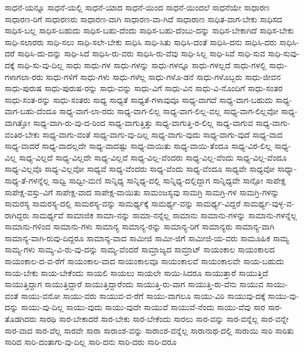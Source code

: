 {ಸಾಧನೆ-ಯನ್ನೂ
ಸಾಧನೆ-ಯಲ್ಲಿ
ಸಾಧನೆ-ಯಾದ
ಸಾಧನೆ-ಯಿಂದ
ಸಾಧನೆ-ಯಿಂದಲೆ
ಸಾಧನೆಯೇ
ಸಾಧಾರಣ
ಸಾಧಾರಣ-ರಿಗೆ
ಸಾಧಾರಣರು
ಸಾಧಾರಣ-ವಾಗಿ
ಸಾಧಾರಣ-ವಾ-ಗಿದೆ
ಸಾಧಾರಾಣ
ಸಾಧಿತ-ವಾಗ-ಬೇಕು
ಸಾಧಿಸದ
ಸಾಧಿಸ-ಬಲ್ಲ
ಸಾಧಿಸ-ಬಹುದು
ಸಾಧಿಸ-ಬಹು-ದೆಂದು
ಸಾಧಿಸ-ಬಹು-ದೆಂಬು-ದನ್ನು
ಸಾಧಿಸ-ಬೇಕಾಗಿದೆ
ಸಾಧಿಸ-ಬೇಕು
ಸಾಧಿ-ಸಲಾರರು
ಸಾಧಿ-ಸಲು
ಸಾಧಿ-ಸಲೇ-ಬೇಕು
ಸಾಧಿಸಿ
ಸಾಧಿ-ಸಿತು
ಸಾಧಿಸಿ-ದಂತೆ
ಸಾಧಿಸಿ-ದನು
ಸಾಧಿಸಿ-ದರು
ಸಾಧಿಸಿ-ದರೆ
ಸಾಧಿಸಿ-ದು-ದನ್ನು
ಸಾಧಿ-ಸಿದೆ
ಸಾಧಿಸಿ-ರು-ವರು
ಸಾಧಿಸಿ-ರು-ವೆವು
ಸಾಧಿ-ಸಿಲ್ಲ
ಸಾಧಿ-ಸಿವೆ
ಸಾಧಿ-ಸುವ
ಸಾಧಿ-ಸುವು-ದಕ್ಕೆ
ಸಾಧಿ-ಸು-ವು-ದಿಲ್ಲ
ಸಾಧು
ಸಾಧು-ಗಳ
ಸಾಧು-ಗಳನ್ನು
ಸಾಧು-ಗಳನ್ನೂ
ಸಾಧು-ಗಳಲ್ಲದೆ
ಸಾಧು-ಗಳಲ್ಲಿ
ಸಾಧು-ಗಳಾಗಲಾ-ರರು
ಸಾಧು-ಗಳಿಗೆ
ಸಾಧು-ಗಳು
ಸಾಧು-ಗಳೆಲ್ಲ
ಸಾಧು-ಗಳೊ-ಡನೆ
ಸಾಧು-ಗಳೊಬ್ಬರು
ಸಾಧು-ಜೀವನ
ಸಾಧು-ಪುರುಷ
ಸಾಧು-ಪುರುಷ-ರನ್ನು
ಸಾಧು-ವನ್ನು
ಸಾಧು-ವಿಗೆ
ಸಾಧು-ವಿನ
ಸಾಧು-ವಿ-ನೊಂದಿಗೆ
ಸಾಧು-ಸಂತರ
ಸಾಧು-ಸಂತ-ರನ್ನು
ಸಾಧು-ಸಂತರು
ಸಾಧ್ಯ
ಸಾಧ್ಯತೆ
ಸಾಧ್ಯತೆ-ಗಳಾವುವೂ
ಸಾಧ್ಯ-ವಾಗದೆ
ಸಾಧ್ಯ-ವಾಗ-ಬಹುದು
ಸಾಧ್ಯ-ವಾಗ-ಬಹು-ದೆಂದೂ
ಸಾಧ್ಯ-ವಾಗ-ಲಾ-ರದು
ಸಾಧ್ಯ-ವಾಗ-ಲಿಲ್ಲ
ಸಾಧ್ಯ-ವಾಗ-ಲಿಲ್ಲ-ವಲ್ಲ
ಸಾಧ್ಯ-ವಾಗ-ಲಿಲ್ಲವೋ
ಸಾಧ್ಯ-ವಾಗಿತ್ತೋ
ಸಾಧ್ಯ-ವಾಗಿ-ರು-ವು-ದ-ರಿಂದ
ಸಾಧ್ಯ-ವಾಗುತ್ತಿತ್ತು
ಸಾಧ್ಯ-ವಾಗುತ್ತಿ-ರ-ಲಿಲ್ಲ
ಸಾಧ್ಯ-ವಾಗುವ
ಸಾಧ್ಯ-ವಾಗು-ವಂತಿರ-ಬೇಕು
ಸಾಧ್ಯ-ವಾಗು-ವಂತೆ
ಸಾಧ್ಯ-ವಾಗು-ವು-ದಿಲ್ಲ
ಸಾಧ್ಯ-ವಾಗು-ವುದು
ಸಾಧ್ಯ-ವಾಗು-ವುದೆ
ಸಾಧ್ಯ-ವಾದ
ಸಾಧ್ಯ-ವಾದರೆ
ಸಾಧ್ಯ-ವಾದಲ್ಲದೇ
ಸಾಧ್ಯ-ವಾದಷ್ಟು
ಸಾಧ್ಯ-ವಾಯಿತು
ಸಾಧ್ಯ-ವಾಯಿ-ತೆಂದೂ
ಸಾಧ್ಯ-ವಿರ-ಲಿಲ್ಲ
ಸಾಧ್ಯ-ವಿಲ್ಲ
ಸಾಧ್ಯ-ವಿಲ್ಲದೆ
ಸಾಧ್ಯ-ವಿಲ್ಲದೇ
ಸಾಧ್ಯ-ವಿಲ್ಲವೆ
ಸಾಧ್ಯ-ವಿಲ್ಲ-ವೆಂದರು
ಸಾಧ್ಯ-ವಿಲ್ಲ-ವೆಂದು
ಸಾಧ್ಯ-ವಿಲ್ಲ-ವೆಂದೂ
ಸಾಧ್ಯ-ವಿಲ್ಲವೊ
ಸಾಧ್ಯ-ವಿಲ್ಲವೋ
ಸಾಧ್ಯವೆ
ಸಾಧ್ಯ-ವೆಂದರು
ಸಾಧ್ಯ-ವೆಂದು
ಸಾಧ್ಯ-ವೆಂದೂ
ಸಾಧ್ಯವೇ
ಸಾಧ್ಯವೋ
ಸಾಧ್ಯಾ-ಸಾಧ್ಯ-ತೆ-ಗಳನ್ನೆಲ್ಲ
ಸಾಧ್ವಿ
ಸಾಧ್ವೀ-ಮಣಿ
ಸಾನ್ನಿಧ್ಯ
ಸಾನ್ನಿಧ್ಯ-ದಲ್ಲಿ
ಸಾನ್ನಿಧ್ಯ-ದಲ್ಲಿದ್ದಾಗ
ಸಾನ್ನಿಧ್ಯವೇ
ಸಾನ್ಪೋ
ಸಾಪೇಕ್ಷ
ಸಾಪೇಕ್ಷ-ವಸ್ತು-ವಿಗೆ
ಸಾಪೇಕ್ಷ-ವಾದ
ಸಾಪೇಕ್ಷ-ವಾಯಿತು
ಸಾಮಂಜಸ್ಯವು
ಸಾಮಗ್ರಿ
ಸಾಮಗ್ರಿ-ಗಳ
ಸಾಮಗ್ರಿ-ಗಳನ್ನು
ಸಾಮರಸ್ಯ
ಸಾಮರಸ್ಯ-ದಲ್ಲಿ
ಸಾಮರಸ್ಯ-ವನ್ನು
ಸಾಮರ್ಥ್ಯಕ್ಕೆ
ಸಾಮರ್ಥ್ಯ-ವನ್ನು
ಸಾಮರ್ಥ್ಯ-ವಿದ್ದರೆ
ಸಾಮರ್ಥ್ಯ-ವುಳ್ಳ-ವ-ರಾಗಿದ್ದರು
ಸಾಮರ್ಥ್ಯವೆ
ಸಾಮಾಜಿಕ
ಸಾಮಾ-ನನ್ನು
ಸಾಮಾ-ನನ್ನೆಲ್ಲ
ಸಾಮಾನು
ಸಾಮಾನು-ಗಳನ್ನು
ಸಾಮಾನು-ಗಳನ್ನೆಲ್ಲ
ಸಾಮಾನು-ಗಳಿಂದ
ಸಾಮಾನು-ಗಳು
ಸಾಮಾನ್ಯ
ಸಾಮಾನ್ಯ-ರನ್ನು
ಸಾಮಾನ್ಯ-ರಿಗೆ
ಸಾಮಾನ್ಯರು
ಸಾಮಾನ್ಯ-ವಾಗಿ
ಸಾಮಾನ್ಯ-ವಾಗಿ-ರುವು-ದಿದ್ದರೂ
ಸಾಮಾನ್ಯ-ವಾದ
ಸಾಮೀಜಿ
ಸಾಮೀ-ಜಿಗೆ
ಸಾಮೀಜಿ-ಯ-ವರು
ಸಾಮೂಹಿಕ
ಸಾಮ್ಯ
ಸಾಮ್ಯ-ಗಳು
ಸಾಮ್ಯ-ವಿ-ರು-ವು-ದನ್ನು
ಸಾಮ್ಯ-ವೆಂದರೆ
ಸಾಮ್ರಾಜ್ಯದ
ಸಾಮ್ರಾಟ್
ಸಾಯಂಕಾಲ
ಸಾಯಂಕಾಲದ
ಸಾಯಂಕಾಲ-ದ-ವ-ರೆಗೆ
ಸಾಯಂಕಾಲ-ವಾದ
ಸಾಯಂಕಾಲವೂ
ಸಾಯಂಕಾಲವೆ
ಸಾಯಂಕಾಲವೇ
ಸಾಯ-ಬಹುದು
ಸಾಯ-ಬೇಕು
ಸಾಯ-ಬೇಕೆಂದು
ಸಾಯಲಿ
ಸಾಯಲು
ಸಾಯಲೇ
ಸಾಯಿ-ಸಿದರೂ
ಸಾಯುತ್ತಾರೆ
ಸಾಯುತ್ತಿದೆ
ಸಾಯುತ್ತಿದ್ದಾಗ
ಸಾಯುತ್ತಿದ್ದಾರೆ
ಸಾಯುತ್ತಿದ್ದಾರೆಂದು
ಸಾಯುತ್ತಿ-ರು-ವಾಗ
ಸಾಯುತ್ತಿ-ರು-ವೆನು
ಸಾಯುವ
ಸಾಯು-ವಂತೆ
ಸಾಯು-ವನೋ
ಸಾಯು-ವರು
ಸಾಯುವ-ವ-ರೆಗೆ
ಸಾಯು-ವಾಗಲೂ
ಸಾಯು-ವಿರಿ
ಸಾಯುವು-ದಕ್ಕೆ
ಸಾಯು-ವು-ದನ್ನು
ಸಾಯು-ವು-ದಿಲ್ಲ
ಸಾಯು-ವುದು
ಸಾಯು-ವುದೇ
ಸಾಯುವೆ
ಸಾಯುವೆ-ನೆಂದು
ಸಾಯು-ವೆವು
ಸಾರ
ಸಾರ-ತೊಡಗಿದರು
ಸಾರಥಿ
ಸಾರ-ಬೇಕಾದರೆ
ಸಾರ-ಬೇಕು
ಸಾರ-ಬೇಕೆಂದು
ಸಾರಲು
ಸಾರ-ವನ್ನು
ಸಾರ-ವನ್ನೆಲ್ಲ
ಸಾರ-ವನ್ನೇ
ಸಾರ-ವಾದ
ಸಾರ-ವೆಲ್ಲ
ಸಾರವೇ
ಸಾರಾ
ಸಾರಾಂಶ-ವನ್ನು
ಸಾರಾಂಶ-ವನ್ನೆಲ್ಲ
ಸಾರಾನಾಥ-ದಲ್ಲಿ
ಸಾರಾಯಿ
ಸಾರಿ
ಸಾರಿತು
ಸಾರಿದ
ಸಾರಿ-ದಂತಾಗು-ವು-ದಿಲ್ಲ
ಸಾರಿ-ದನು
ಸಾರಿ-ದರು
ಸಾರಿ-ದರೂ
}
